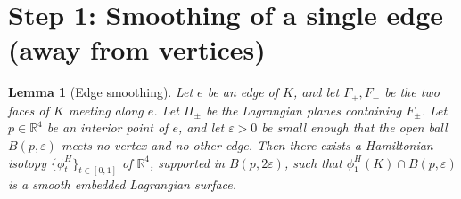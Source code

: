 \documentclass[12pt]{article}
\newtheorem{lemma}[theorem]{Lemma}
\theoremstyle{definition}
\begin{document}
\section*{Step 1: Smoothing of a single edge (away from vertices)}

\begin{lemma}[Edge smoothing]
\label{lem:edge}
Let $e$ be an edge of $K$, and let $F_+, F_-$ be the two faces of $K$ meeting along $e$. Let $\Pi_\pm$ be the Lagrangian planes containing $F_\pm$. Let $p \in \mathbb{R}^4$ be an interior point of $e$, and let $\varepsilon > 0$ be small enough that the open ball $B(p, \varepsilon)$ meets no vertex and no other edge. Then there exists a Hamiltonian isotopy $\{\phi_t^H\}_{t \in [0,1]}$ of $\mathbb{R}^4$, supported in $B(p, 2\varepsilon)$, such that $\phi_1^H(K) \cap B(p,\varepsilon)$ is a smooth embedded Lagrangian surface.
\end{lemma}
\end{document}
